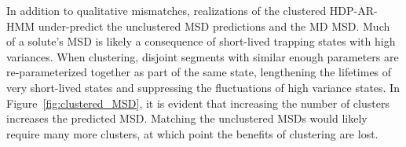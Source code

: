 \documentclass[journal=jpcbfk,manuscript=article]{achemso}
\begin{document}
  In addition to qualitative mismatches, realizations of the clustered HDP-AR-HMM 
  under-predict the unclustered MSD predictions and the MD MSD. Much of a solute's 
  MSD is likely a consequence of short-lived trapping states with high variances.
  When clustering, disjoint segments with similar enough parameters are re-parameterized
  together as part of the same state, lengthening the lifetimes of very short-lived 
  states and suppressing the fluctuations of high variance states. In 
  Figure~\ref{fig:clustered_MSD}, it is evident that increasing the number of clusters
  increases the predicted MSD. Matching the unclustered MSDs would likely require many
  more clusters, at which point the benefits of clustering are lost. 
  
\end{document}
